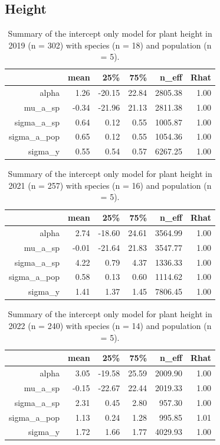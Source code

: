\documentclass{article}
\begin{document}
\subsection*{Height}
\begin{table}[ht]
\centering
\caption{Summary of the intercept only model for plant height in 2019 (n = 302) with species (n = 18) and population (n = 5).} 
\begin{tabular}{rrrrrr}
  \hline
 & mean & 25\% & 75\% & n\_eff & Rhat \\ 
  \hline
alpha & 1.26 & -20.15 & 22.84 & 2805.38 & 1.00 \\ 
  mu\_a\_sp & -0.34 & -21.96 & 21.13 & 2811.38 & 1.00 \\ 
  sigma\_a\_sp & 0.64 & 0.12 & 0.55 & 1005.87 & 1.00 \\ 
  sigma\_a\_pop & 0.65 & 0.12 & 0.55 & 1054.36 & 1.00 \\ 
  sigma\_y & 0.55 & 0.54 & 0.57 & 6267.25 & 1.00 \\ 
  \end{tabular}
\end{table}
\begin{table}[ht]
\centering
\caption{Summary of the intercept only model for plant height in 2021 (n = 257) with species (n = 16) and population (n = 5).} 
\begin{tabular}{rrrrrr}
  \hline
 & mean & 25\% & 75\% & n\_eff & Rhat \\ 
  \hline
alpha & 2.74 & -18.60 & 24.61 & 3564.99 & 1.00 \\ 
  mu\_a\_sp & -0.01 & -21.64 & 21.83 & 3547.77 & 1.00 \\ 
  sigma\_a\_sp & 4.22 & 0.79 & 4.37 & 1336.33 & 1.00 \\ 
  sigma\_a\_pop & 0.58 & 0.13 & 0.60 & 1114.62 & 1.00 \\ 
  sigma\_y & 1.41 & 1.37 & 1.45 & 7806.45 & 1.00 \\ 
  \end{tabular}
\end{table}
\begin{table}[ht]
\centering
\caption{Summary of the intercept only model for plant height in 2022 (n = 240) with species (n = 14) and population (n = 5).} 
\begin{tabular}{rrrrrr}
  \hline
 & mean & 25\% & 75\% & n\_eff & Rhat \\ 
  \hline
alpha & 3.05 & -19.58 & 25.59 & 2009.90 & 1.00 \\ 
  mu\_a\_sp & -0.15 & -22.67 & 22.44 & 2019.33 & 1.00 \\ 
  sigma\_a\_sp & 2.31 & 0.45 & 2.80 & 957.30 & 1.00 \\ 
  sigma\_a\_pop & 1.13 & 0.24 & 1.28 & 995.85 & 1.01 \\ 
  sigma\_y & 1.72 & 1.66 & 1.77 & 4029.93 & 1.00 \\ 
  \end{tabular}
\end{table}\newpage
\end{document}
